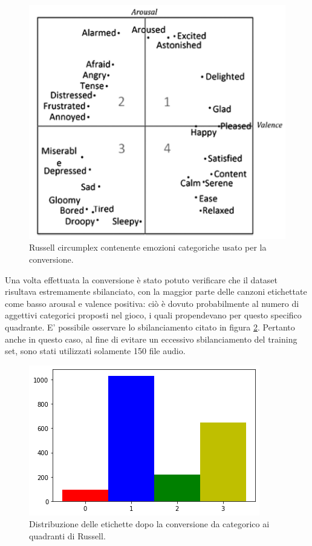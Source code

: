 \documentclass[11pt]{report}
\begin{document}
\begin{figure}
\centering
\includegraphics[scale = 0.6]{img/categorical-to-russell.PNG}
\caption{Russell circumplex contenente emozioni categoriche usato per la conversione\cite{panda2018novel}.}
\label{fig-emotify}
\end{figure}


Una volta effettuata la conversione è stato potuto verificare che il dataset risultava estremamente sbilanciato, con la maggior parte delle canzoni etichettate come basso arousal e valence positiva: ciò è dovuto probabilmente al numero di aggettivi categorici proposti nel gioco, i quali propendevano per questo specifico quadrante. E' possibile osservare lo sbilanciamento citato in figura \ref{fig-emotify2}.
Pertanto anche in questo caso, al fine di evitare un eccessivo sbilanciamento del training set, sono stati utilizzati solamente 150 file audio.


\begin{figure}[h]
\centering
\includegraphics[scale = 0.6]{img/Emotify_class.png}
\caption{ Distribuzione delle etichette dopo la
conversione da categorico ai quadranti di Russell.}
\label{fig-emotify2}
\end{figure}
\end{document}
